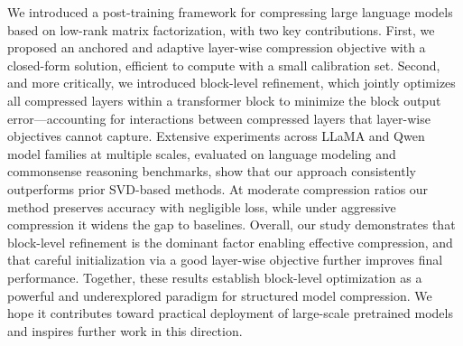 \documentclass[10pt]{article} %
\theoremstyle{definition}
\theoremstyle{remark}
\begin{document}
We introduced a post-training framework for compressing large language models based on low-rank matrix factorization, with two key contributions.
First, we proposed an anchored and adaptive layer-wise compression objective with a closed-form solution, efficient to compute with a small calibration set.
Second, and more critically, we introduced block-level refinement, which jointly optimizes all compressed layers within a transformer block to minimize the block output error---accounting for interactions between compressed layers that layer-wise objectives cannot capture.
Extensive experiments across LLaMA and Qwen model families at multiple scales, evaluated on language modeling and commonsense reasoning benchmarks, show that our approach consistently outperforms prior SVD-based methods.
At moderate compression ratios our method preserves accuracy with negligible loss, while under aggressive compression it widens the gap to baselines.
Overall, our study demonstrates that block-level refinement is the dominant factor enabling effective compression, and that careful initialization via a good layer-wise objective further improves final performance.
Together, these results establish block-level optimization as a powerful and underexplored paradigm for structured model compression. We hope it contributes toward practical deployment of large-scale pretrained models and inspires further work in this direction.




\end{document}
